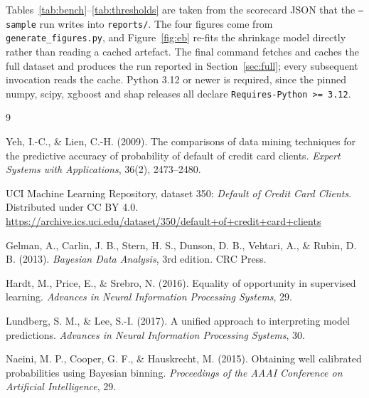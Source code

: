 \documentclass[10pt,a4paper]{article}
\newcommand{\code}[1]{\texttt{\small #1}}
\begin{document}
Tables~\ref{tab:bench}--\ref{tab:thresholds} are taken from the scorecard JSON that
the \code{--sample} run writes into \code{reports/}. The four figures come from
\code{generate\_figures.py}, and Figure~\ref{fig:eb} re-fits the shrinkage model
directly rather than reading a cached artefact. The final command fetches and
caches the full dataset and produces
the run reported in Section~\ref{sec:full}; every subsequent invocation reads the
cache. Python 3.12 or newer is required, since the pinned numpy, scipy, xgboost and
shap releases all declare \code{Requires-Python >= 3.12}.

\begin{thebibliography}{9}
\footnotesize
\setlength{\itemsep}{2pt}

Yeh, I.-C., \& Lien, C.-H. (2009).
The comparisons of data mining techniques for the predictive accuracy of
probability of default of credit card clients.
\emph{Expert Systems with Applications}, 36(2), 2473--2480.

UCI Machine Learning Repository, dataset 350: \emph{Default of Credit Card
Clients}. Distributed under CC BY 4.0.
\url{https://archive.ics.uci.edu/dataset/350/default+of+credit+card+clients}

Gelman, A., Carlin, J. B., Stern, H. S., Dunson, D. B., Vehtari, A., \&
Rubin, D. B. (2013). \emph{Bayesian Data Analysis}, 3rd edition. CRC Press.

Hardt, M., Price, E., \& Srebro, N. (2016). Equality of opportunity in
supervised learning. \emph{Advances in Neural Information Processing Systems},
29.

Lundberg, S. M., \& Lee, S.-I. (2017). A unified approach to interpreting model
predictions. \emph{Advances in Neural Information Processing Systems}, 30.

Naeini, M. P., Cooper, G. F., \& Hauskrecht, M. (2015). Obtaining well
calibrated probabilities using Bayesian binning. \emph{Proceedings of the AAAI
Conference on Artificial Intelligence}, 29.

\end{thebibliography}
\end{document}
